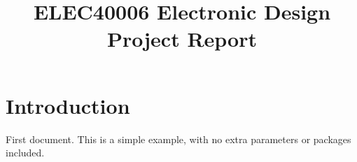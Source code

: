 \documentclass{report}
\title{ELEC40006 Electronic Design Project Report}
\author{}
\begin{document}
\maketitle
\section{Introduction}

First document. This is a simple example, with no 
extra parameters or packages included.
\end{document}
